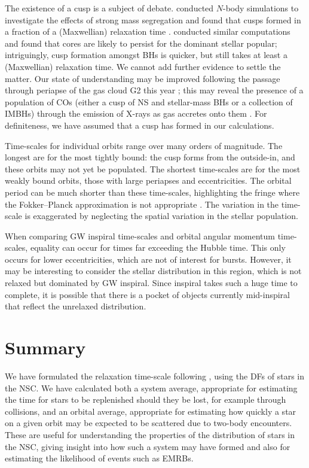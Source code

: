 The existence of a cusp is a subject of debate. \citet{Preto2010} conducted $N$-body simulations to investigate the effects of strong mass segregation \citep{Alexander2009, Keshet2009} and found that cusps formed in a fraction of a (Maxwellian) relaxation time \citep{Amaro-Seoane2011d}. \citet{Gualandris2012} conducted similar computations and found that cores are likely to persist for the dominant stellar popular; intriguingly, cusp formation amongst BHs is quicker, but still takes at least a (Maxwellian) relaxation time. We cannot add further evidence to settle the matter. Our state of understanding may be improved following the passage through periapse of the gas cloud G2 this year \citep{Gillessen2013}; this may reveal the presence of a population of COs (either a cusp of NS and stellar-mass BHs or a collection of IMBHs) through the emission of X-rays as gas accretes onto them \citep{Bartos2013}. For definiteness, we have assumed that a cusp has formed in our calculations.

Time-scales for individual orbits range over many orders of magnitude. The longest are for the most tightly bound: the cusp forms from the outside-in, and these orbits may not yet be populated. The shortest time-scales are for the most weakly bound orbits, those with large periapses and eccentricities. The orbital period can be much shorter than these time-scales, highlighting the fringe where the Fokker--Planck approximation is not appropriate \citep{Spitzer1972Jr}. The variation in the time-scale is exaggerated by neglecting the spatial variation in the stellar population.

When comparing GW inspiral time-scales and orbital angular momentum time-scales, equality can occur for times far exceeding the Hubble time. This only occurs for lower eccentricities, which are not of interest for bursts. However, it may be interesting to consider the stellar distribution in this region, which is not relaxed but dominated by GW inspiral. Since inspiral takes such a huge time to complete, it is possible that there is a pocket of objects currently mid-inspiral that reflect the unrelaxed distribution.

\section{Summary}

We have formulated the relaxation time-scale following \citet{Chandrasekhar1960}, using the DFs of stars in the NSC. We have calculated both a system average, appropriate for estimating the time for stars to be replenished should they be lost, for example through collisions, and an orbital average, appropriate for estimating how quickly a star on a given orbit may be expected to be scattered due to two-body encounters. These are useful for understanding the properties of the distribution of stars in the NSC, giving insight into how such a system may have formed and also for estimating the likelihood of events such as EMRBs.

